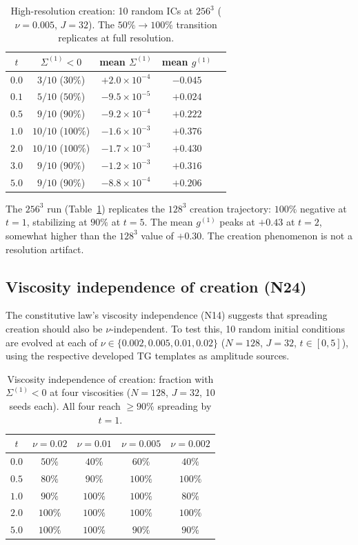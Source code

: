 \documentclass[11pt]{article}
\theoremstyle{definition}
\begin{document}
\begin{table}[h]
\centering
\caption{High-resolution creation: 10 random ICs
at $256^3$ ($\nu=0.005$, $J=32$).  The
$50\%\to 100\%$ transition replicates at full
resolution.}
\label{tab:creation-256}
\begin{tabular}{@{}ccccc@{}}
\toprule
$t$ & $\Sigma^{(1)}<0$ & mean $\Sigma^{(1)}$
  & mean $g^{(1)}$ \\
\midrule
$0.0$ & $3/10$ ($30\%$)
  & $+2.0\times 10^{-4}$ & $-0.045$ \\
$0.1$ & $5/10$ ($50\%$)
  & $-9.5\times 10^{-5}$ & $+0.024$ \\
$0.5$ & $9/10$ ($90\%$)
  & $-9.2\times 10^{-4}$ & $+0.222$ \\
$1.0$ & $10/10$ ($100\%$)
  & $-1.6\times 10^{-3}$ & $+0.376$ \\
$2.0$ & $10/10$ ($100\%$)
  & $-1.7\times 10^{-3}$ & $+0.430$ \\
$3.0$ & $9/10$ ($90\%$)
  & $-1.2\times 10^{-3}$ & $+0.316$ \\
$5.0$ & $9/10$ ($90\%$)
  & $-8.8\times 10^{-4}$ & $+0.206$ \\
\bottomrule
\end{tabular}
\end{table}

The $256^3$ run (Table~\ref{tab:creation-256})
replicates the $128^3$ creation trajectory:
$100\%$ negative at $t=1$, stabilizing at $90\%$
at $t=5$.  The mean $g^{(1)}$ peaks at $+0.43$
at $t=2$, somewhat higher than the $128^3$ value of
$+0.30$.  The creation phenomenon is not a
resolution artifact.

\subsection{Viscosity independence of creation (N24)}
\label{sec:creation-viscosity}

The constitutive law's viscosity independence (N14)
suggests that spreading creation should also be
$\nu$-independent.  To test this, 10 random
initial conditions are evolved at each of
$\nu\in\{0.002,0.005,0.01,0.02\}$ ($N=128$,
$J=32$, $t\in[0,5]$), using the respective
developed TG templates as amplitude sources.

\begin{table}[h]
\centering
\caption{Viscosity independence of creation: fraction
with $\Sigma^{(1)}<0$ at four viscosities
($N=128$, $J=32$, 10 seeds each).  All four reach
$\geq 90\%$ spreading by $t=1$.}
\label{tab:creation-nu}
\begin{tabular}{@{}ccccc@{}}
\toprule
$t$ & $\nu=0.02$ & $\nu=0.01$ & $\nu=0.005$
  & $\nu=0.002$ \\
\midrule
$0.0$ & $50\%$ & $40\%$ & $60\%$ & $40\%$ \\
$0.5$ & $80\%$ & $90\%$ & $100\%$ & $100\%$ \\
$1.0$ & $90\%$ & $100\%$ & $100\%$ & $80\%$ \\
$2.0$ & $100\%$ & $100\%$ & $100\%$ & $100\%$ \\
$5.0$ & $100\%$ & $100\%$ & $90\%$ & $90\%$ \\
\bottomrule
\end{tabular}
\end{table}
\end{document}
